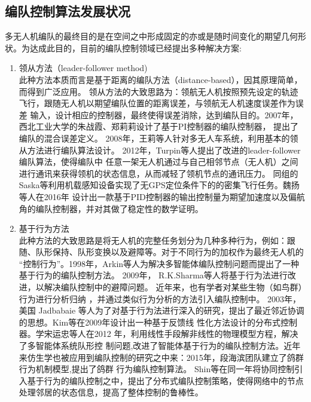 \subsection{编队控制算法发展状况}
多无人机编队的最终目的是在空间之中形成固定的亦或是随时间变化的期望几何形状。为达成此目的，目前的编队控制领域已经提出多种解决方案:
\begin{enumerate}
    \item 领从方法（leader-follower method)\\
        此种方法本质而言是基于距离的编队方法（distance-based），因其原理简单，而得到广泛应用。
        领从方法的大致思路为：领航无人机按照预先设定的轨迹飞行，跟随无人机以期望编队位置的距离误差，与领航无人机速度误差作为误差
        输入，设计相应的控制器，最终使得误差消除，达到编队目的。2007年，西北工业大学的朱战霞、郑莉莉设计了基于PI控制器的编队控制器，
        提出了编队的混合误差定义。\cite{ZhuZhanXia2007}
        2008年，王莉等人针对多无人车系统，利用基本的领从方法进行编队算法设计。\cite{WangLi2008}
        2012年，Turpin等人提出了改进的leader-follower 编队算法，使得编队中
        任意一架无人机通过与自己相邻节点（无人机）之间进行通讯来获得领机的状态信息，从而减轻了领机节点的通讯压力。
        \cite{Turpin2012Trajectory}同组的Saska等利用机载感知设备实现了无GPS定位条件下的的密集飞行任务。\cite{Saska2017System}魏扬等人在2016年
        设计出一款基于PID控制器的输出控制量为期望加速度以及偏航角的编队控制器，并对其做了稳定性的数学证明。\cite{WeiYang2016}
    \item 基于行为方法\\
        此种方法的大致思路是将无人机的完整任务划分为几种多种行为，例如：跟随、队形保持、队形变换以及避障等。对于不同行为的加权作为最终无人机的
        “控制行为”。1998年，Arkin等人为解决多智能体编队控制问题而提出了一种基于行为的编队控制方法。\cite{Balch1998Behavior} 2009年，
        R.K.Sharma等人将基于行为法进行改进，以解决编队控制中的避障问题。\cite{Sharma2009Collision} 近年来，也有学者对某些生物（如鸟群）行为进行分析归纳
        ，并通过类似行为分析的方法引入编队控制中。
        2003年，美国 Jadbabaie 等人为了对基于行为法进行深入的研究，提出了最近邻近协调的思想。\cite{Jadbabaie2003Coordination}Kim等在2009年设计出一种基于反馈线
        性化方法设计的分布式控制器。\cite{Kim2009}学宋运忠等人在2012 年，利用线性手段解非线性的物理模型方程，解决了多智能体系统队形控
        制问题,改进了智能体基于行为的编队控制方法。\cite{SongYunZhong2012}近年来仿生学也被应用到编队控制的研究之中来：2015年，段海滨团队建立了鸽群行为机制模型,提出了鸽群
        行为编队控制算法。\cite{DuanHaiBin2015}
        Shin等在同一年将协同控制引入基于行为的编队控制之中，提出了分布式编队控制策略，使得网络中的节点处理邻居的状态信息，提高了整体控制的鲁棒性。\cite{Jongho2015}

\end{enumerate}
